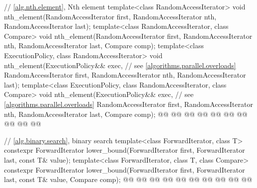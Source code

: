 \begin{codeblock}
{  // \ref{alg.nth.element}, Nth element
  template<class RandomAccessIterator>
    void nth_element(RandomAccessIterator first, RandomAccessIterator nth,
                     RandomAccessIterator last);
  template<class RandomAccessIterator, class Compare>
    void nth_element(RandomAccessIterator first, RandomAccessIterator nth,
                     RandomAccessIterator last, Compare comp);
  template<class ExecutionPolicy, class RandomAccessIterator>
    void nth_element(ExecutionPolicy&& exec, // see \ref{algorithms.parallel.overloads}
                     RandomAccessIterator first, RandomAccessIterator nth,
                     RandomAccessIterator last);
  template<class ExecutionPolicy, class RandomAccessIterator, class Compare>
    void nth_element(ExecutionPolicy&& exec, // see \ref{algorithms.parallel.overloads}
                     RandomAccessIterator first, RandomAccessIterator nth,
                     RandomAccessIterator last, Compare comp);
  @@
    @@
        @@
      @@
      @@
    @@
      @@
      @@
        @@
  @\added{\}}@

  // \ref{alg.binary.search}, binary search
  template<class ForwardIterator, class T>
    constexpr ForwardIterator
      lower_bound(ForwardIterator first, ForwardIterator last,
                  const T& value);
  template<class ForwardIterator, class T, class Compare>
    constexpr ForwardIterator
      lower_bound(ForwardIterator first, ForwardIterator last,
                  const T& value, Compare comp);
  @@
    @@
        @@
      @@
                    @@
    @@
        @@
      @@
        @@
  @\added{\}}@

}
\end{codeblock}
